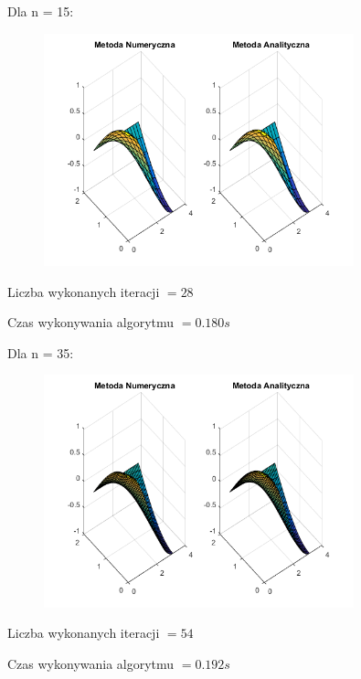 Dla n = 15:

\begin{figure}[!ht]
	\begin{center}
		\includegraphics[width=0.8\textwidth]{Lab6/charts/young/zad2/15.png}
	\end{center}
\end{figure}

Liczba wykonanych iteracji $ = 28 $

Czas wykonywania algorytmu $ = 0.180 s$

Dla n = 35:

\begin{figure}[!ht]
	\begin{center}
		\includegraphics[width=0.8\textwidth]{Lab6/charts/young/zad2/35.png}
	\end{center}
\end{figure}

Liczba wykonanych iteracji $ = 54 $

Czas wykonywania algorytmu $ = 0.192 s$

